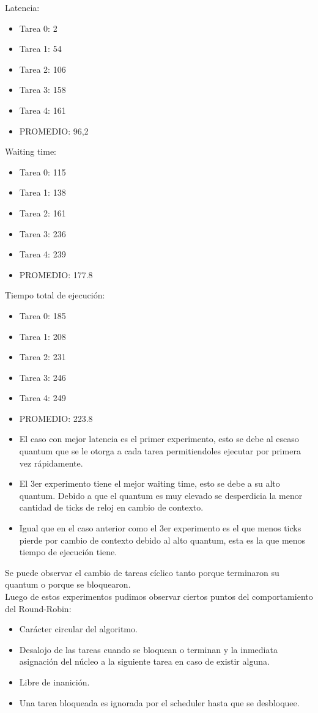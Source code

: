 \indent Latencia:\
\begin{itemize}
 \item Tarea 0: 2
 \item Tarea 1: 54
 \item Tarea 2: 106
 \item Tarea 3: 158
 \item Tarea 4: 161
 \item PROMEDIO: 96,2
\end{itemize}
\indent Waiting time:\
\begin{itemize}
 \item Tarea 0: 115
 \item Tarea 1: 138
 \item Tarea 2: 161
 \item Tarea 3: 236
 \item Tarea 4: 239
 \item PROMEDIO: 177.8
\end{itemize}
\indent Tiempo total de ejecuci\'{o}n:\
\begin{itemize}
 \item Tarea 0: 185
 \item Tarea 1: 208
 \item Tarea 2: 231
 \item Tarea 3: 246
 \item Tarea 4: 249
 \item PROMEDIO: 223.8
\end{itemize}

\indent
\begin{itemize}
 \item El caso con mejor latencia es el primer experimento, esto se debe al escaso quantum que se le otorga a cada tarea
 permitiendoles ejecutar por primera vez r\'{a}pidamente.
 \item El 3er experimento tiene el mejor waiting time, esto se debe a su alto quantum. Debido a que el quantum es muy elevado 
 se desperdicia la menor cantidad de ticks de reloj en cambio de contexto.
 \item Igual que en el caso anterior como el 3er experimento es el que menos ticks pierde por cambio de contexto debido al 
 alto quantum, esta es la que menos tiempo de ejecuci\'{o}n tiene.
\end{itemize}


\indent Se puede observar el cambio de tareas cíclico tanto porque terminaron su quantum o porque se bloquearon.\\


\indent Luego de estos experimentos pudimos observar ciertos puntos del comportamiento del Round-Robin:\\
\begin{itemize}
\item  Carácter circular del algoritmo.
\item  Desalojo de las tareas cuando se bloquean o terminan y la inmediata asignación del núcleo a la siguiente tarea en caso de existir alguna.
\item  Libre de inanición.
\item  Una tarea bloqueada es ignorada por el scheduler hasta que se desbloquee.
\end{itemize}

